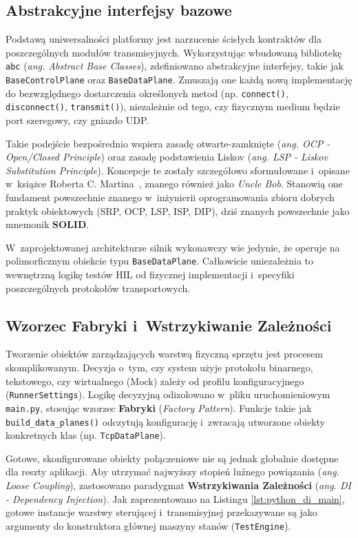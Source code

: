\subsection{Abstrakcyjne interfejsy bazowe}

Podstawą uniwersalności platformy jest narzucenie ścisłych kontraktów dla poszczególnych modułów transmisyjnych.
Wykorzystując wbudowaną bibliotekę \texttt{abc} (\textit{ang. Abstract Base Classes}), zdefiniowano abstrakcyjne interfejsy, takie jak \texttt{BaseControlPlane} oraz \texttt{BaseDataPlane}.
Zmuszają one każdą nową implementację do bezwzględnego dostarczenia określonych metod (np. \texttt{connect()}, \texttt{disconnect()}, \texttt{transmit()}), niezależnie od tego, czy fizycznym medium będzie port szeregowy, czy gniazdo UDP.

Takie podejście bezpośrednio wspiera zasadę otwarte-zamknięte (\textit{ang. OCP - Open/Closed Principle}) oraz zasadę podstawienia Liskov (\textit{ang. LSP - Liskov Substitution Principle}).
Koncepcje te zostały szczegółowo sformułowane i~opisane w~książce Roberta C.
Martina~\cite{solid}, znanego również jako \textit{Uncle Bob}.
Stanowią one fundament powszechnie znanego w~inżynierii oprogramowania zbioru dobrych praktyk obiektowych (SRP, OCP, LSP, ISP, DIP), dziś znanych powszechnie jako mnemonik \textbf{SOLID}.

W~zaprojektowanej architekturze silnik wykonawczy wie jedynie, że operuje na polimorficznym obiekcie typu \texttt{BaseDataPlane}.
Całkowicie uniezależnia to wewnętrzną logikę testów HIL od fizycznej implementacji i~specyfiki poszczególnych protokołów transportowych.

\subsection{Wzorzec Fabryki i~Wstrzykiwanie Zależności}

Tworzenie obiektów zarządzających warstwą fizyczną sprzętu jest procesem skomplikowanym.
Decyzja o~tym, czy system użyje protokołu binarnego, tekstowego, czy wirtualnego (Mock) zależy od profilu konfiguracyjnego (\texttt{RunnerSettings}).
Logikę decyzyjną odizolowano w~pliku uruchomieniowym \texttt{main.py}, stosując wzorzec \textbf{Fabryki} (\textit{Factory Pattern}).
Funkcje takie jak \texttt{build\_data\_planes()} odczytują konfigurację i~zwracają utworzone obiekty konkretnych klas (np. \texttt{TcpDataPlane}).

Gotowe, skonfigurowane obiekty połączeniowe nie są jednak globalnie dostępne dla reszty aplikacji.
Aby utrzymać najwyższy stopień luźnego powiązania (\textit{ang. Loose Coupling}), zastosowano paradygmat \textbf{Wstrzykiwania Zależności} (\textit{ang. DI - Dependency Injection}).
Jak zaprezentowano na Listingu \ref{lst:python_di_main}, gotowe instancje warstwy sterującej i~transmisyjnej przekazywane są jako argumenty do konstruktora głównej maszyny stanów (\texttt{TestEngine}).

